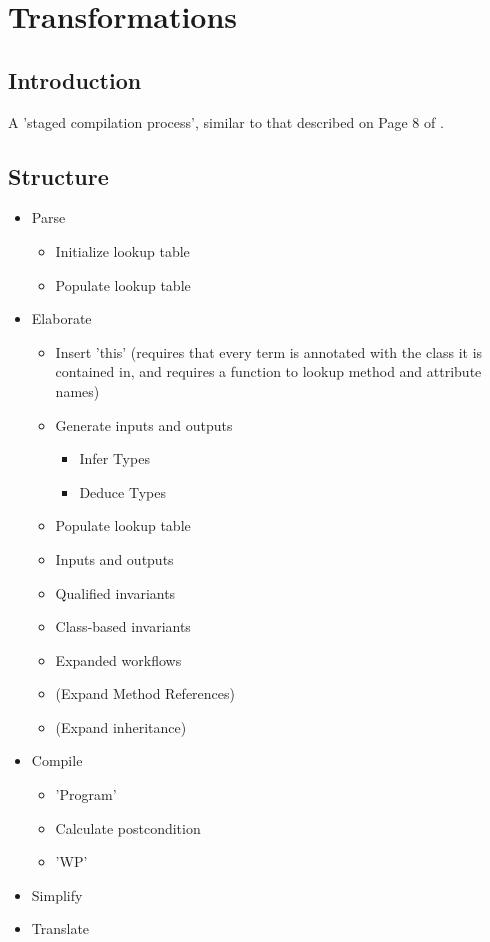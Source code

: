 \chapter{Transformations}

\section{Introduction}

A 'staged compilation process', similar to that described on Page 8 of \cite{KatsVisser2010}.

\section{Structure}

\begin{itemize}
  \item Parse
  \begin{itemize}
    \item Initialize lookup table
    \item Populate lookup table
  \end{itemize}
  \item Elaborate
  \begin{itemize}
    \item Insert 'this'
     (requires that every term is annotated with the class it is contained in, 
      and requires a function to lookup method and attribute names) 
    \item Generate inputs and outputs
    \begin{itemize}
      \item Infer Types
      \item Deduce Types
    \end{itemize}
    \item Populate lookup table
    \item Inputs and outputs
    \item Qualified invariants
    \item Class-based invariants
    \item Expanded workflows
    \item (Expand Method References)
    \item (Expand inheritance)
  \end{itemize}    
  \item Compile
  \begin{itemize}
    \item 'Program'
    \item Calculate postcondition
    \item 'WP'
  \end{itemize}
  \item Simplify
  \item Translate
\end{itemize}

